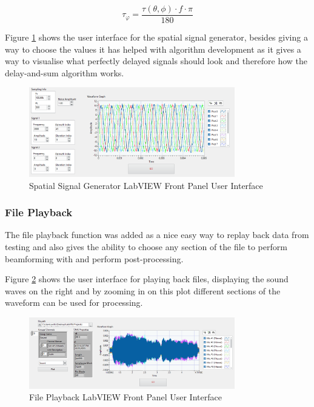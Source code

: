 \documentclass{UoNMCHA}
\numberwithin{equation}{section}
\begin{document}
    \begin{equation}
        \tau_{\varphi} = \frac{\tau(\theta,\phi) \cdot f \cdot \pi}{180}
        \label{eq:phase delay}
    \end{equation}
    
    Figure \ref{fig:SignalGenPanel} shows the user interface for the spatial signal generator, besides giving a way to choose the values it has helped with algorithm development as it gives a way to visualise what perfectly delayed signals should look and therefore how the delay-and-sum algorithm works.
    
    \begin{figure}[H]
        \centering
        \includegraphics[keepaspectratio, width = 0.8\textwidth]{Figures/SignalGenPanel_5ULA50mm.png}
        \caption{Spatial Signal Generator LabVIEW Front Panel User Interface}
        \label{fig:SignalGenPanel}
    \end{figure}    

\subsubsection{File Playback} \label{sec:File Playback}

The file playback function was added as a nice easy way to replay back data from testing and also gives the ability to choose any section of the file to perform beamforming with and perform post-processing.

Figure \ref{fig:FilePlaybackPanel} shows the user interface for playing back files, displaying the sound waves on the right and by zooming in on this plot different sections of the waveform can be used for processing.

    \begin{figure}[H]
        \centering
        \includegraphics[keepaspectratio, width = 0.8\textwidth]{Figures/FilePlaybackPanel.png}
        \caption{File Playback LabVIEW Front Panel User Interface}
        \label{fig:FilePlaybackPanel}
    \end{figure}  
\end{document}
